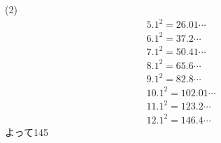 \documentclass[12pt,a4j]{jarticle}
\begin{document}
(2)
\begin{align*}
5.1^2=26.01\cdots
\\6.1^2=37.2\cdots
\\7.1^2=50.41\cdots
\\8.1^2=65.6\cdots
\\9.1^2=82.8\cdots
\\10.1^2=102.01\cdots
\\11.1^2=123.2\cdots
\\12.1^2=146.4\cdots
\end{align*}
よって145
\end{document}
